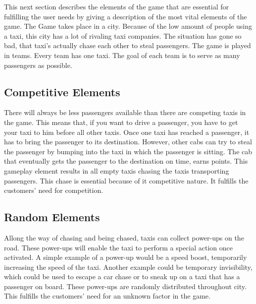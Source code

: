

This next section describes the elements of the game that are essential for fulfilling the user needs by giving a description of the most vital elements of the game. The Game takes place in a city. Because of the low amount of people using a taxi, this city has a lot of rivaling taxi companies. The situation has gone so bad, that taxi's actually chase each other to steal passengers. The game is played in teams. Every team has one taxi. The goal of each team is to serve as many passengers as possible.


\subsection{Competitive Elements}
There will always be less passengers available than there are competing taxis in the game. This means that, if you want to drive a passenger, you have to get your taxi to him before all other taxis. Once one taxi has reached a passenger, it has to bring the passenger to its destination. However, other cabs can try to steal the passenger by bumping into the taxi in which the passenger is sitting. The cab that eventually gets the passenger to the destination on time, earns points. This gameplay element results in all empty taxis chasing the taxis transporting passengers. This chase is essential because of it competitive nature. It fulfills the customers' need for competition. 

\subsection{Random Elements}

Allong the way of chasing and being chased, taxis can collect power-ups on the road. These power-ups will enable the taxi to perform a special action once activated. A simple example of a power-up would be a speed boost, temporarily increasing the speed of the taxi. Another example could be temporary invisibility, which could be used to escape a car chase or to sneak up on a taxi that has a passenger on board. These power-ups are randomly distributed throughout city. This fulfills the customers' need for an unknown factor in the game. 

